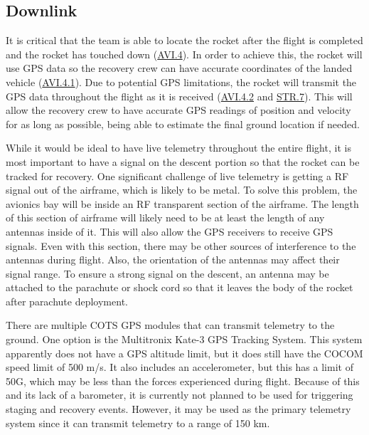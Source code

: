 \subsection{Downlink}
It is critical that the team is able to locate the rocket after the flight is completed and the rocket has touched down (\hyperlink{AVI.4}{AVI.4}). In order to achieve this, the rocket will use GPS data so the recovery crew can have accurate coordinates of the landed vehicle (\hyperlink{AVI.4.1}{AVI.4.1}). Due to potential GPS limitations, the rocket will transmit the GPS data throughout the flight as it is received (\hyperlink{AVI.4.2}{AVI.4.2} and \hyperlink{STR.7}{STR.7}). This will allow the recovery crew to have accurate GPS readings of position and velocity for as long as possible, being able to estimate the final ground location if needed.

While it would be ideal to have live telemetry throughout the entire flight, it is most important to have a signal on the descent portion so that the rocket can be tracked for recovery. One significant challenge of live telemetry is getting a RF signal out of the airframe, which is likely to be metal. To solve this problem, the avionics bay will be inside an RF transparent section of the airframe. The length of this section of airframe will likely need to be at least the length of any antennas inside of it. This will also allow the GPS receivers to receive GPS signals. Even with this section, there may be other sources of interference to the antennas during flight. Also, the orientation of the antennas may affect their signal range. To ensure a strong signal on the descent, an antenna may be attached to the parachute or shock cord so that it leaves the body of the rocket after parachute deployment.

There are multiple COTS GPS modules that can transmit telemetry to the ground. One option is the Multitronix Kate-3 GPS Tracking System. This system apparently does not have a GPS altitude limit, but it does still have the COCOM speed limit of 500 m/s. It also includes an accelerometer, but this has a limit of 50G, which may be less than the forces experienced during flight. Because of this and its lack of a barometer, it is currently not planned to be used for triggering staging and recovery events. However, it may be used as the primary telemetry system since it can transmit telemetry to a range of 150 km.

